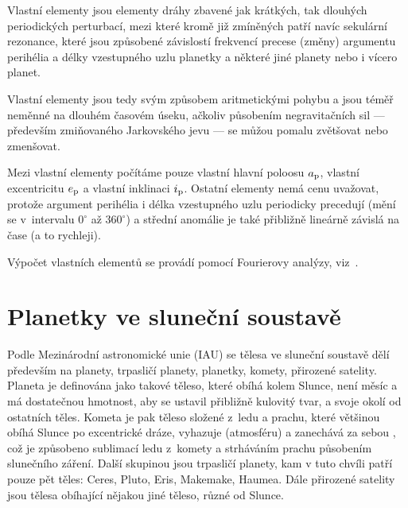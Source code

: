 \documentclass[A4paper, 12pt, oneside]{book}
\begin{document}
Vlastní elementy jsou elementy dráhy zbavené jak krátkých, tak dlouhých periodických perturbací, mezi které kromě již zmíněných patří navíc sekulární rezonance, které jsou způsobené závislostí frekvencí precese (změny) argumentu perihélia a délky vzestupného uzlu planetky a některé jiné planety nebo i vícero planet.

Vlastní elementy jsou tedy svým způsobem aritmetickými  pohybu a jsou téměř neměnné na dlouhém časovém úseku, ačkoliv působením negravitačních sil --- především zmiňovaného Jarkovského jevu --- se můžou pomalu zvětšovat nebo zmenšovat. 

Mezi vlastní elementy počítáme pouze vlastní hlavní poloosu $a_{\rm p}$, vlastní excentricitu $e_{\rm p}$ a vlastní inklinaci $i_{\rm p}$. Ostatní elementy nemá cenu uvažovat, protože argument perihélia i délka vzestupného uzlu periodicky precedují (mění se v~intervalu $0^\circ$ až $360^\circ$) a střední anomálie je také přibližně lineárně závislá na čase (a to rychleji).

Výpočet vlastních elementů se provádí pomocí Fourierovy analýzy, viz~\cite{sidlichovsky96}. 

\chapter{Planetky ve sluneční soustavě}


Podle Mezinárodní astronomické unie (IAU) se tělesa ve sluneční soustavě dělí především na planety, trpasličí planety, planetky, komety, přirozené satelity. Planeta je definována jako takové těleso, které obíhá kolem Slunce, není měsíc a má dostatečnou hmotnost, aby se ustavil přibližně kulovitý tvar, a  svoje okolí od ostatních těles. Kometa je pak těleso složené z~ledu a prachu, které většinou obíhá Slunce po excentrické dráze, vyhazuje  (atmosféru) a zanechává za sebou , což je způsobeno sublimací ledu z~komety a strháváním prachu působením slunečního záření. Další skupinou jsou trpasličí planety, kam v tuto chvíli patří pouze pět těles: Ceres, Pluto, Eris, Makemake, Haumea. Dále přirozené satelity jsou tělesa obíhající nějakou jiné těleso, různé od Slunce.
\end{document}
